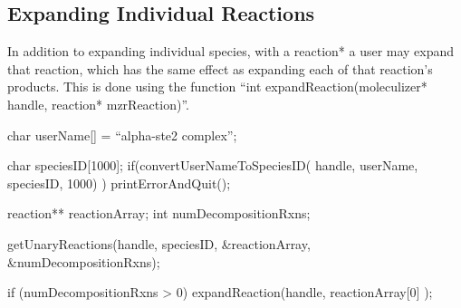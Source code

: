 \subsection{Expanding Individual Reactions}
In addition to expanding individual species, with a reaction* a user
may expand that reaction, which has the same effect as expanding each
of that reaction's products.  This is done using the function ``int
expandReaction(moleculizer* handle, reaction* mzrReaction)''. 

\begin{ExampleC}
  char userName[] = ``alpha-ste2 complex'';

  char speciesID[1000];
  if(convertUserNameToSpeciesID( handle, userName, speciesID, 1000) ) 
  { 
    printErrorAndQuit();
  }

  reaction** reactionArray;
  int numDecompositionRxns;

  getUnaryReactions(handle, speciesID, &reactionArray, &numDecompositionRxns);

  if (numDecompositionRxns > 0)
  {
    expandReaction(handle, reactionArray[0] );
  }
  

\end{ExampleC}










